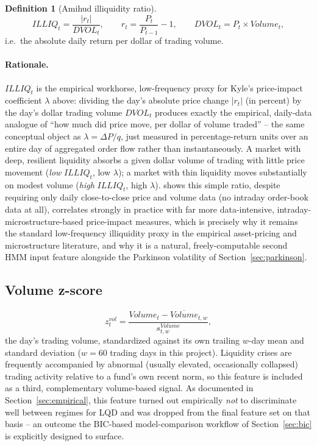\documentclass[11pt]{article}
\theoremstyle{definition}
\newtheorem{definition}[theorem]{Definition}
\theoremstyle{remark}
\begin{document}
\begin{definition}[Amihud illiquidity ratio]
\[
ILLIQ_t = \frac{|r_t|}{DVOL_t}, \qquad r_t = \frac{P_t}{P_{t-1}}-1, \qquad DVOL_t = P_t\times Volume_t,
\]
i.e.\ the absolute daily return per dollar of trading volume.
\end{definition}

\paragraph{Rationale.} $ILLIQ_t$ is the empirical workhorse, low-frequency proxy for Kyle's price-impact coefficient $\lambda$ above: dividing the day's absolute price change $|r_t|$ (in percent) by the day's dollar trading volume $DVOL_t$ produces exactly the empirical, daily-data analogue of ``how much did price move, per dollar of volume traded'' -- the same conceptual object as $\lambda=\Delta P/q$, just measured in percentage-return units over an entire day of aggregated order flow rather than instantaneously. A market with deep, resilient liquidity absorbs a given dollar volume of trading with little price movement (\emph{low} $ILLIQ_t$, low $\lambda$); a market with thin liquidity moves substantially on modest volume (\emph{high} $ILLIQ_t$, high $\lambda$). \cite{amihud2002} shows this simple ratio, despite requiring only daily close-to-close price and volume data (no intraday order-book data at all), correlates strongly in practice with far more data-intensive, intraday-microstructure-based price-impact measures, which is precisely why it remains the standard low-frequency illiquidity proxy in the empirical asset-pricing and microstructure literature, and why it is a natural, freely-computable second HMM input feature alongside the Parkinson volatility of Section~\ref{sec:parkinson}.

\subsection{Volume z-score}
\label{sec:volz}

\[
z^{vol}_t = \frac{Volume_t-\overline{Volume}_{t,w}}{s^{Volume}_{t,w}},
\]
the day's trading volume, standardized against its own trailing $w$-day mean and standard deviation ($w=60$ trading days in this project). Liquidity crises are frequently accompanied by abnormal (usually elevated, occasionally collapsed) trading activity relative to a fund's own recent norm, so this feature is included as a third, complementary volume-based signal. As documented in Section~\ref{sec:empirical}, this feature turned out empirically \emph{not} to discriminate well between regimes for LQD and was dropped from the final feature set on that basis -- an outcome the BIC-based model-comparison workflow of Section~\ref{sec:bic} is explicitly designed to surface.
\end{document}
